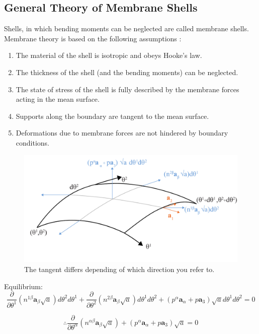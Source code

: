 \subsection{General Theory of Membrane Shells}


Shells, in which bending moments can be neglected are called membrane
shells. Membrane theory is based on the following assumptions \cite{ref:Domokos}:

\begin{enumerate}
\item The material of the shell is isotropic and obeys Hooke's law.
\item The thickness of the shell (and the bending moments) can be neglected.
\item The state of stress of the shell is fully described by the membrane
forces acting in the mean surface.
\item Supports along the boundary are tangent to the mean surface.
\item Deformations due to membrane forces are not hindered by boundary
conditions.
\end{enumerate}

\begin{figure}[H]
\centering
\includegraphics[width=0.9\linewidth ]{figure/Theory/membraneDefinition.pdf}
\caption{The tangent differs depending of which direction you refer to. }
\end{figure}


Equilibrium: 
\begin{equation}
\frac{\partial}{\partial \theta^1}(n^{1 \beta}\textbf{a}_{\beta} \sqrt{a}) d\theta^2 d\theta^1 + \frac{\partial}{\partial \theta^2}(n^{2 \beta}\textbf{a}_{\beta} \sqrt{a}) d\theta^1 d\theta^2 + ( p^{\alpha}\textbf{a}_\alpha + p\textbf{a}_3)\sqrt{a} d\theta^1 d\theta^2  = 0
\end{equation}



\begin{equation} \label{membraneEq}
\therefore  \frac{\partial}{\partial \theta^ \alpha} (n^{\alpha \beta} \textbf{a}_\beta \sqrt{ a}) + ( p^{\alpha}\textbf{a}_\alpha + p\textbf{a}_3)\sqrt{a} = 0
\end{equation}

